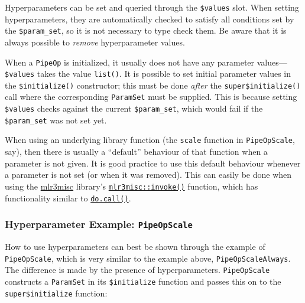 \documentclass[]{scrbook}
\newenvironment{Shaded}{\begin{snugshade}}{\end{snugshade}}
\newcommand{\NormalTok}[1]{#1}
\newcommand{\OperatorTok}[1]{\textcolor[rgb]{0.81,0.36,0.00}{\textbf{#1}}}
\renewenvironment{Shaded} {\begin{snugshade}\small} {\end{snugshade}}
\begin{document}
Hyperparameters can be set and queried through the \texttt{\$values} slot.
When setting hyperparameters, they are automatically checked to satisfy all conditions set by the \texttt{\$param\_set}, so it is not necessary to type check them.
Be aware that it is always possible to \emph{remove} hyperparameter values.

When a \texttt{PipeOp} is initialized, it usually does not have any parameter values---\texttt{\$values} takes the value \texttt{list()}.
It is possible to set initial parameter values in the \texttt{\$initialize()} constructor; this must be done \emph{after} the \texttt{super\$initialize()} call where the corresponding \texttt{ParamSet} must be supplied.
This is because setting \texttt{\$values} checks against the current \texttt{\$param\_set}, which would fail if the \texttt{\$param\_set} was not set yet.

When using an underlying library function (the \texttt{scale} function in \texttt{PipeOpScale}, say), then there is usually a ``default'' behaviour of that function when a parameter is not given.
It is good practice to use this default behaviour whenever a parameter is not set (or when it was removed).
This can easily be done when using the \href{https://mlr3misc.mlr-org.com}{mlr3misc} library's \href{https://mlr3misc.mlr-org.com/reference/invoke.html}{\texttt{mlr3misc::invoke()}} function, which has functionality similar to \href{https://www.rdocumentation.org/packages/base/topics/do.call}{\texttt{do.call()}}.

\hypertarget{hyperparameter-example-pipeopscale}{%
\subsubsection{\texorpdfstring{Hyperparameter Example: \texttt{PipeOpScale}}{Hyperparameter Example: PipeOpScale}}\label{hyperparameter-example-pipeopscale}}

How to use hyperparameters can best be shown through the example of \texttt{PipeOpScale}, which is very similar to the example above, \texttt{PipeOpScaleAlways}.
The difference is made by the presence of hyperparameters. \texttt{PipeOpScale} constructs a \texttt{ParamSet} in its \texttt{\$initialize} function and passes this on to the \texttt{super\$initialize} function:

\begin{Shaded}
\end{Shaded}
\end{document}
